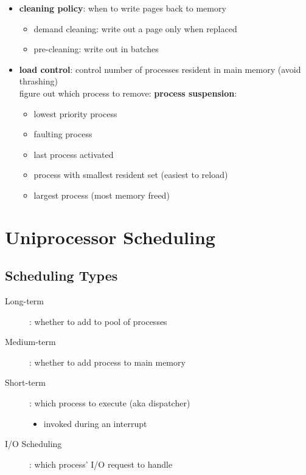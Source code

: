 \documentclass[]{article}
\theoremstyle{definition}
\begin{document}
\begin{itemize}
		\item \textbf{cleaning policy}: when to write pages back to memory
			\begin{itemize}
				\item demand cleaning: write out a page only when replaced
				\item pre-cleaning: write out in batches 
			\end{itemize}
		\item \textbf{load control}: control number of processes resident in main memory (avoid thrashing) \\
			figure out which process to remove: \textbf{process suspension}:
			\begin{itemize}
				\item lowest priority process
				\item faulting process
				\item last process activated
				\item process with smallest resident set (easiest to reload)
				\item largest process (most memory freed)
			\end{itemize}
	\end{itemize}

	\section{Uniprocessor Scheduling}

	\subsection{Scheduling Types}
	\begin{description}
		\item[Long-term]: whether to add to pool of processes
		\item[Medium-term]: whether to add process to main memory
		\item[Short-term]: which process to execute (aka dispatcher)
			\begin{itemize}
				\item invoked during an interrupt
			\end{itemize}
		\item[I/O Scheduling]: which process' I/O request to handle
	\end{description}
\end{document}

